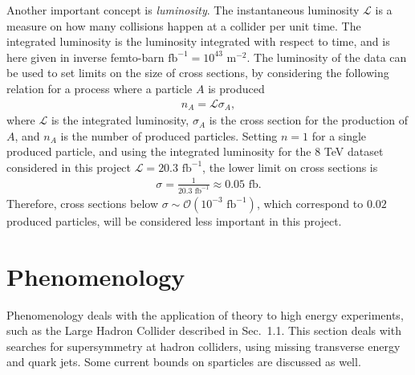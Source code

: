 \documentclass[twoside,english]{uiofysmaster}
\begin{document}
Another important concept is \textit{luminosity}. The instantaneous luminosity $\mathcal{L}$ is a measure on how many collisions happen at a collider per unit time. The integrated luminosity is the luminosity integrated with respect to time, and is here given in inverse femto-barn $\text{fb}^{-1} = 10^{43} \text{ m}^{-2}$. The luminosity of the data can be used to set limits on the size of cross sections, by considering the following relation for a process where a particle $A$ is produced
\begin{align}
n_{A} = \mathcal{L} \sigma_{A} ,
\end{align}
where $\mathcal{L}$ is the integrated luminosity, $\sigma_{A}$ is the cross section for the production of $A$, and $n_A$ is the number of produced particles. Setting $n=1$ for a single produced particle, and using the integrated luminosity for the 8 TeV dataset considered in this project $\mathcal{L} = 20.3 \text{ fb}^{-1}$, the lower limit on cross sections is
\begin{align}
\sigma  = \frac{1}{20.3 \text{ fb}^{-1}} \approx 0.05 \text{ fb}.
\end{align}
Therefore, cross sections below $\sigma \sim \mathcal{O}(10^{-3} \text{ fb}^{-1})$, which correspond to $0.02$ produced particles, will be considered less important in this project.


\section{Phenomenology}

Phenomenology deals with the application of theory to high energy experiments, such as the Large Hadron Collider described in Sec.\ 1.1. This section deals with searches for supersymmetry at hadron colliders, using missing transverse energy and quark jets. Some current bounds on sparticles are discussed as well.
\end{document}
